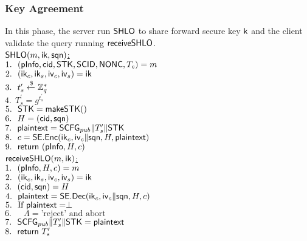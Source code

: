 \subsubsection{Key Agreement}
In this phase, the server run $\mathsf{SHLO}$ to share forward
secure key $\mathsf{k}$ and the client validate the query running
$\mathsf{receiveSHLO}$.
\\
\noindent
\underline{$\mathsf{SHLO}(m, \mathsf{ik}, \mathsf{sqn})$:} \\
 $1.\ \ (\mathsf{pInfo}, \mathsf{cid}, \mathsf{STK}, \mathsf{SCID}, \mathsf{NONC}, T_c) = m$ \\
 $2.\ \ (\mathsf{ik}_c, \mathsf{ik}_s, \mathsf{iv}_c, \mathsf{iv}_s) = \mathsf{ik}$ \\
 $3.\ \ t_s^{\prime} \xleftarrow{\$} \mathbb{Z}_{q}^{\ast}$ \\
 $4.\ \ T_s^{\prime} = g^{t_s^{\prime}}$ \\
 $5.\ \ \mathsf{STK} = \mathsf{makeSTK}()$ \\
 $6.\ \ H = (\mathsf{cid}, \mathsf{sqn})$ \\
 $7.\ \ \mathsf{plaintext} = \mathsf{SCFG}_{pub} \| T_s^{\prime} \| \mathsf{STK} $\\
 $8.\ \ c = \mathsf{SE}.\mathsf{Enc}(\mathsf{ik}_c, \mathsf{iv}_c \| \mathsf{sqn}, H, \mathsf{plaintext})$ \\
 $9.\ \ \mathsf{return}\ (\mathsf{pInfo}, H, c)$ \\
\underline{$\mathsf{receiveSHLO}(m, \mathsf{ik})$:} \\
 $1.\ \ (\mathsf{pInfo}, H, c) = m$ \\
 $2.\ \ (\mathsf{ik}_c, \mathsf{ik}_s, \mathsf{iv}_c, \mathsf{iv}_s) = \mathsf{ik}$ \\
 $3.\ \ (\mathsf{cid}, \mathsf{sqn}) = H$ \\
 $4.\ \ \mathsf{plaintext} = \mathsf{SE}.\mathsf{Dec}(\mathsf{ik}_c, \mathsf{iv}_c \| \mathsf{sqn}, H, c)$ \\
 $5.\ \ \text{If }\mathsf{plaintext} = \perp$ \\
 $6.\ \ \quad \Lambda = \text{'reject' and abort}$ \\
 $7.\ \ \mathsf{SCFG}_{pub} \| T_s^{\prime} \| \mathsf{STK}  = \mathsf{plaintext} $ \\
 $8.\ \ \mathsf{return}\ T_s^{\prime}$ \\
